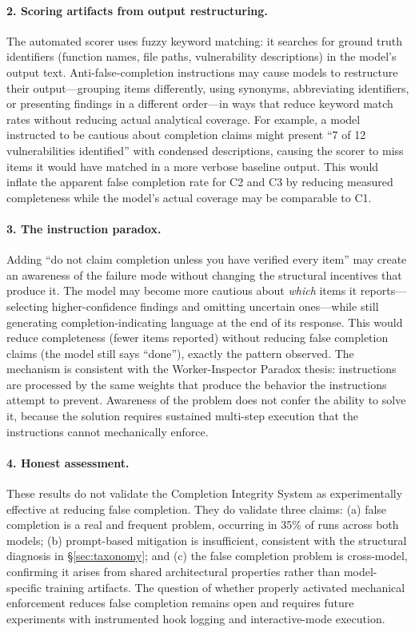 \paragraph{2. Scoring artifacts from output restructuring.}
The automated scorer uses fuzzy keyword matching: it searches for ground truth identifiers (function names, file paths, vulnerability descriptions) in the model's output text.
Anti-false-completion instructions may cause models to restructure their output---grouping items differently, using synonyms, abbreviating identifiers, or presenting findings in a different order---in ways that reduce keyword match rates without reducing actual analytical coverage.
For example, a model instructed to be cautious about completion claims might present ``7 of 12 vulnerabilities identified'' with condensed descriptions, causing the scorer to miss items it would have matched in a more verbose baseline output.
This would inflate the apparent false completion rate for C2 and C3 by reducing measured completeness while the model's actual coverage may be comparable to C1.

\paragraph{3. The instruction paradox.}
Adding ``do not claim completion unless you have verified every item'' may create an awareness of the failure mode without changing the structural incentives that produce it.
The model may become more cautious about \emph{which} items it reports---selecting higher-confidence findings and omitting uncertain ones---while still generating completion-indicating language at the end of its response.
This would reduce completeness (fewer items reported) without reducing false completion claims (the model still says ``done''), exactly the pattern observed.
The mechanism is consistent with the Worker-Inspector Paradox thesis: instructions are processed by the same weights that produce the behavior the instructions attempt to prevent.
Awareness of the problem does not confer the ability to solve it, because the solution requires sustained multi-step execution that the instructions cannot mechanically enforce.

\paragraph{4. Honest assessment.}
These results do not validate the Completion Integrity System as experimentally effective at reducing false completion.
They do validate three claims: (a) false completion is a real and frequent problem, occurring in 35\% of runs across both models; (b) prompt-based mitigation is insufficient, consistent with the structural diagnosis in \S\ref{sec:taxonomy}; and (c) the false completion problem is cross-model, confirming it arises from shared architectural properties rather than model-specific training artifacts.
The question of whether properly activated mechanical enforcement reduces false completion remains open and requires future experiments with instrumented hook logging and interactive-mode execution.


